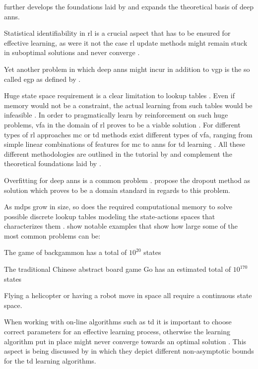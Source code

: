 \citet{Bengio2009} further develops the foundations laid by \citet{Lecun1998} and expands the theoretical basis of deep \glspl{ann}.

Statistical identifiability in \gls{rl} is a crucial aspect that has to be ensured for effective learning, as were it not the case \gls{rl} update methods might remain stuck in suboptimal solutions and never converge \citep{Zhang2011}.

Yet another problem in which deep \glspl{ann} might incur in addition to \gls{vgp} is the so called \gls{egp} as defined by \citet{Pascanu2012}.

Huge state space requirement is a clear limitation to lookup tables \citep{Sutton2017}. Even if memory would not be a constraint, the actual learning from such tables would be infeasible \citep{Sutton2017}. In order to pragmatically learn by reinforcement on such huge problems, \gls{vfa} in the domain of \gls{rl} proves to be a viable solution \citep{Sutton2017}. For different types of \gls{rl} approaches \ie \gls{mc} or \gls{td} methods exist different types of \gls{vfa}, ranging from simple linear combinations of features for \gls{mc} to \glspl{ann} for \gls{td} learning \citep{Sutton2017}. All these different methodologies are outlined in the tutorial by \citet{Geramifard2013} and complement the theoretical foundations laid by \citet{Sutton2017}.

Overfitting for deep \glspl{ann} is a common problem \citep[p. 218]{Sutton2017}. \citet{Srivastava2014} propose the dropout method as solution which proves to be a domain standard in regards to this problem.

As \glspl{mdp} grow in size, so does the required computational memory to solve possible discrete lookup tables modeling the state-actions spaces that characterizes them \citep{Sutton2017}. \citet{Sutton2017} show notable examples that show how large some of the most common problems can be:
\begin{enumerate*}
	\item The game of backgammon has a total of $10^{20}$ states
	\item The traditional Chinese abstract board game Go has an estimated total of $10^{170}$ states
	\item Flying a helicopter or having a robot move in space all require a continuous state space.
\end{enumerate*}

When working with on-line algorithms such as \gls{td} it is important to choose correct parameters for an effective learning process, otherwise the learning algorithm put in place might never converge towards an optimal solution \citep{Sutton2017}. This aspect is being discussed by \citet{Korda2014} in which they depict different non-asymptotic bounds for the \gls{td} learning algorithms.

